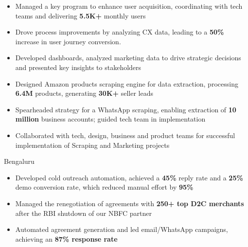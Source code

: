 \documentclass[10pt,a4paper]{altacv}
\begin{document}
\newcommand{\cvtagwhite}[1]{%
  \mbox{\tikz[baseline=-0.6ex]%
    \node[anchor=base, draw=none, rounded corners=0.2ex, inner sep=0.4ex, text=white, fill=white]%
    {\small\strut #1};}%
  }%

\name{\textcolor{SlateGrey}{SHIKHAR SHARMA}}


\begin{fullwidth}
\makecvheader
\end{fullwidth}



\begin{itemize}
\item Managed a key program to enhance user acquisition, coordinating with tech teams and delivering \textbf{5.5K+} monthly users
\item Drove process improvements by analyzing CX data, leading to a \textbf{50\%} increase in user journey conversion.
\item Developed dashboards, analyzed marketing data to drive strategic decisions and presented key insights to stakeholders
\item Designed Amazon products scraping engine for data extraction, processing \textbf{6.4M} products, generating \textbf{30K+} seller leads
\item  Spearheaded strategy for a WhatsApp scraping, enabling extraction of \textbf{10 million} business accounts; guided tech team in implementation
\item Collaborated with tech, design, business and product teams for successful implementation of Scraping and Marketing projects
\end{itemize}

  {Bengaluru}
\begin{itemize}
\item Developed cold outreach automation, achieved a \textbf{45\% }reply rate and a \textbf{25\%} demo conversion rate, which reduced manual effort by \textbf{95\% }
\item Managed the renegotiation of agreements with \textbf{250+ top D2C merchants} after the RBI shutdown of our NBFC partner
\item Automated agreement generation and led email/WhatsApp campaigns, achieving an \textbf{87\% response rate} 
\end{itemize}
\end{document}
